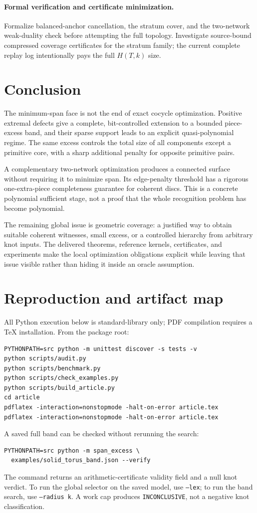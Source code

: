 \documentclass[11pt,letterpaper]{article}
\theoremstyle{definition}
\begin{document}
\paragraph{Formal verification and certificate minimization.}
Formalize balanced-anchor cancellation, the stratum cover, and the two-network weak-duality check before attempting the full topology. Investigate source-bound compressed coverage certificates for the stratum family; the current complete replay log intentionally pays the full $H(T,k)$ size.

\section{Conclusion}
The minimum-span face is not the end of exact cocycle optimization. Positive extremal defects give a complete, bit-controlled extension to a bounded piece-excess band, and their sparse support leads to an explicit quasi-polynomial regime. The same excess controls the total size of all components except a primitive core, with a sharp additional penalty for opposite primitive pairs.

A complementary two-network optimization produces a connected surface without requiring it to minimize span. Its edge-penalty threshold has a rigorous one-extra-piece completeness guarantee for coherent discs. This is a concrete polynomial sufficient stage, not a proof that the whole recognition problem has become polynomial.

The remaining global issue is geometric coverage: a justified way to obtain suitable coherent witnesses, small excess, or a controlled hierarchy from arbitrary knot inputs. The delivered theorems, reference kernels, certificates, and experiments make the local optimization obligations explicit while leaving that issue visible rather than hiding it inside an oracle assumption.

\appendix
\section{Reproduction and artifact map}\label{app:reproduce}
All Python execution below is standard-library only; PDF compilation requires a TeX installation. From the package root:
\begin{lstlisting}
PYTHONPATH=src python -m unittest discover -s tests -v
python scripts/audit.py
python scripts/benchmark.py
python scripts/check_examples.py
python scripts/build_article.py
cd article
pdflatex -interaction=nonstopmode -halt-on-error article.tex
pdflatex -interaction=nonstopmode -halt-on-error article.tex
\end{lstlisting}
A saved full band can be checked without rerunning the search:
\begin{lstlisting}
PYTHONPATH=src python -m span_excess \
  examples/solid_torus_band.json --verify
\end{lstlisting}
The command returns an arithmetic-certificate validity field and a null knot verdict. To run the global selector on the saved model, use \texttt{--lex}; to run the band search, use \texttt{--radius k}. A work cap produces \texttt{INCONCLUSIVE}, not a negative knot classification.
\end{document}
